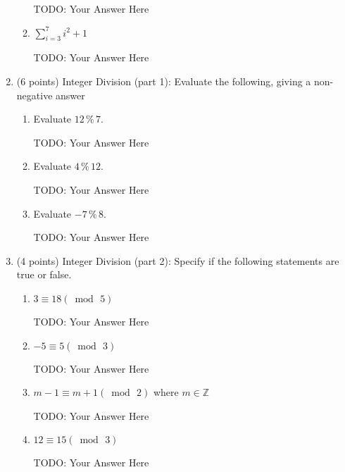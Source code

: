 \documentclass{article}
\begin{document}
\begin{enumerate}
\begin{enumerate}
        {\color{red} TODO: Your Answer Here}
        
        \item $\sum\limits_{i=3}^7 i^2+1$
             
        {\color{red} TODO: Your Answer Here}
        
    \end{enumerate}
    
    \item{\large (6 points) Integer Division (part 1): Evaluate the following, giving a non-negative answer}
    \begin{enumerate}
        \item Evaluate $12\,\%\,7$.
             
        {\color{red} TODO: Your Answer Here}
        
        \item Evaluate $4\,\%\,12$.
             
        {\color{red} TODO: Your Answer Here}
        
        \item Evaluate $-7\,\%\,8$.
             
        {\color{red} TODO: Your Answer Here}
        

    \end{enumerate}
    
    \item{\large (4 points) Integer Division (part 2): Specify if the following statements are true or false.}
    \begin{enumerate}
        \item $3\equiv 18 (\bmod\, 5)$
             
        {\color{red} TODO: Your Answer Here}
        
        \item $-5\equiv 5 (\bmod\, 3)$
             
        {\color{red} TODO: Your Answer Here}
        
        \item $m-1\equiv m+1 (\bmod\, 2)$ where $m\in \mathbb{Z}$
             
        {\color{red} TODO: Your Answer Here}
        
        \item $12\equiv 15 (\bmod\, 3)$ 
             
        {\color{red} TODO: Your Answer Here}
        

    \end{enumerate}
    

\end{enumerate}
\end{document}
